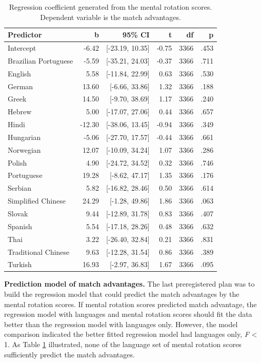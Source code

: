 \documentclass[
  man]{apa7}
\begin{document}
\begin{table}

\caption{\label{tab:prediction-coef}Regression coefficient generated from the mental rotation scores. Dependent variable is the match advantages.}
\centering
\begin{tabular}[t]{lrrrrr}
\toprule
Predictor & b & 95\% CI & t & df & p\\
\midrule
Intercept & -6.42 & {}[-23.19, 10.35] & -0.75 & 3366 & .453\\
Brazilian Portuguese & -5.59 & {}[-35.21, 24.03] & -0.37 & 3366 & .711\\
English & 5.58 & {}[-11.84, 22.99] & 0.63 & 3366 & .530\\
German & 13.60 & {}[-6.66, 33.86] & 1.32 & 3366 & .188\\
Greek & 14.50 & {}[-9.70, 38.69] & 1.17 & 3366 & .240\\
\addlinespace
Hebrew & 5.00 & {}[-17.07, 27.06] & 0.44 & 3366 & .657\\
Hindi & -12.30 & {}[-38.06, 13.45] & -0.94 & 3366 & .349\\
Hungarian & -5.06 & {}[-27.70, 17.57] & -0.44 & 3366 & .661\\
Norwegian & 12.07 & {}[-10.09, 34.24] & 1.07 & 3366 & .286\\
Polish & 4.90 & {}[-24.72, 34.52] & 0.32 & 3366 & .746\\
\addlinespace
Portuguese & 19.28 & {}[-8.62, 47.17] & 1.35 & 3366 & .176\\
Serbian & 5.82 & {}[-16.82, 28.46] & 0.50 & 3366 & .614\\
Simplified Chinese & 24.29 & {}[-1.28, 49.86] & 1.86 & 3366 & .063\\
Slovak & 9.44 & {}[-12.89, 31.78] & 0.83 & 3366 & .407\\
Spanish & 5.54 & {}[-17.18, 28.26] & 0.48 & 3366 & .632\\
\addlinespace
Thai & 3.22 & {}[-26.40, 32.84] & 0.21 & 3366 & .831\\
Traditional Chinese & 9.63 & {}[-12.28, 31.54] & 0.86 & 3366 & .389\\
Turkish & 16.93 & {}[-2.97, 36.83] & 1.67 & 3366 & .095\\
\bottomrule
\end{tabular}
\end{table}

\textbf{Prediction model of match advantages.} The last preregistered plan was to build the regression model that could predict the match advantages by the mental rotation scores. If mental rotation scores predicted match advantage, the regression model with languages and mental rotation scores should fit the data better than the regression model with languages only. However, the model comparison indicated the better fitted regression model had languages only, \emph{F} \textless{} 1. As Table \ref{tab:prediction-coef} illustrated, none of the language set of mental rotation scores sufficiently predict the match advantages.
\end{document}
